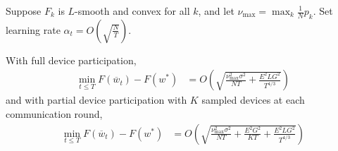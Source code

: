 
\begin{theorem}
	Suppose $F_{k}$ is $L$-smooth and convex for all $k$, and let $\nu_{\max}=\max_{k}\frac{1}{N}p_{k}$.
	Set learning rate $\alpha_{t}=O(\sqrt{\frac{N}{T}})$.
	
	With full device participation, 
	\begin{align*}
	\min_{t\leq T}F(\overline{w}_{t})-F(w^{\ast}) & =O(\sqrt{\frac{\nu_{\max}^{2}\sigma^{2}}{NT}+\frac{E^{2}LG^{2}}{T^{4/3}}})
	\end{align*}
	and with partial device participation with $K$ sampled devices at
	each communication round, 
	\begin{align*}
	\min_{t\leq T}F(\overline{w}_{t})-F(w^{\ast}) & =O(\sqrt{\frac{\nu_{\max}^{2}\sigma^{2}}{NT}+\frac{E^{2}G^{2}}{KT}+\frac{E^{2}LG^{2}}{T^{4/3}}})
	\end{align*}
\end{theorem}

